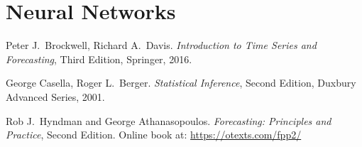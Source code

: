 \documentclass[11pt,a4]{article}
\begin{document}
\section{Neural Networks}

\begin{thebibliography}{99}

 Peter J.~Brockwell, Richard A.~Davis. \emph{Introduction to Time Series and Forecasting}, Third Edition, Springer, 2016. 

 George Casella, Roger L.~Berger. \emph{Statistical Inference}, 
Second Edition, Duxbury Advanced Series, 2001.

 Rob J.~Hyndman and George Athanasopoulos. \emph{Forecasting: Principles and Practice}, Second Edition. Online book at: \url{https://otexts.com/fpp2/}

\end{thebibliography}
\end{document}
